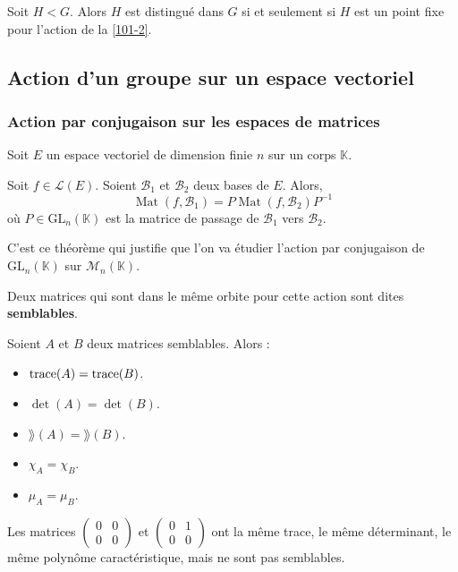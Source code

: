 	\begin{proposition}
		Soit $H < G$. Alors $H$ est distingué dans $G$ si et seulement si $H$ est un point fixe pour l'action de la \cref{101-2}.
	\end{proposition}

	\subsection{Action d'un groupe sur un espace vectoriel}

	\subsubsection{Action par conjugaison sur les espaces de matrices}

	Soit $E$ un espace vectoriel de dimension finie $n$ sur un corps $\mathbb{K}$.


	\begin{theorem}
		Soit $f \in \mathcal{L}(E)$. Soient $\mathcal{B}_1$ et $\mathcal{B}_2$ deux bases de $E$. Alors,
		\[ \operatorname{Mat}(f, \mathcal{B}_1) = P \operatorname{Mat}(f, \mathcal{B}_2) P^{-1} \]
		où $P \in \mathrm{GL}_n(\mathbb{K})$ est la matrice de passage de $\mathcal{B}_1$ vers $\mathcal{B}_2$.
	\end{theorem}

	C'est ce théorème qui justifie que l'on va étudier l'action par conjugaison de $\mathrm{GL}_n(\mathbb{K})$ sur $\mathcal{M}_n(\mathbb{K})$.

	\begin{definition}
		Deux matrices qui sont dans le même orbite pour cette action sont dites \textbf{semblables}.
	\end{definition}

	\begin{theorem}
		Soient $A$ et $B$ deux matrices semblables. Alors :
		\begin{itemize}
			\item $\operatorname{trace}(A) = \operatorname{trace}(B)$.
			\item $\det(A) = \det(B)$.
			\item $\rang(A) = \rang(B)$.
			\item $\chi_A = \chi_B$.
			\item $\mu_A = \mu_B$.
		\end{itemize}
	\end{theorem}

	\begin{cexample}
		Les matrices $\begin{pmatrix} 0 & 0 \\ 0 & 0\end{pmatrix}$ et $\begin{pmatrix} 0 & 1 \\ 0 & 0\end{pmatrix}$ ont la même trace, le même déterminant, le même polynôme caractéristique, mais ne sont pas semblables.
	\end{cexample}

